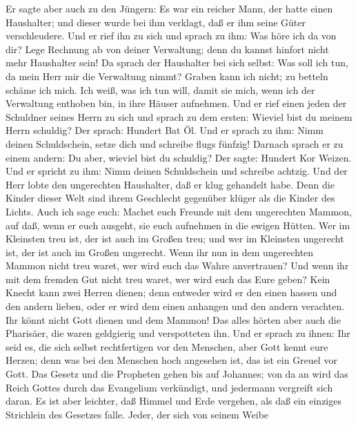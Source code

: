  Er sagte aber auch zu den Jüngern: Es war ein reicher
Mann, der hatte einen Haushalter; und dieser wurde bei ihm verklagt, daß
er ihm seine Güter verschleudere.  Und er rief ihn zu sich
und sprach zu ihm: Was höre ich da von dir? Lege Rechnung ab von deiner
Verwaltung; denn du kannst hinfort nicht mehr Haushalter sein!
 Da sprach der Haushalter bei sich selbst: Was soll ich
tun, da mein Herr mir die Verwaltung nimmt? Graben kann ich nicht; zu
betteln schäme ich mich.  Ich weiß, was ich tun will,
damit sie mich, wenn ich der Verwaltung enthoben bin, in ihre Häuser
aufnehmen.  Und er rief einen jeden der Schuldner seines
Herrn zu sich und sprach zu dem ersten: Wieviel bist du meinem Herrn
schuldig?  Der sprach: Hundert Bat Öl. Und er sprach zu
ihm: Nimm deinen Schuldschein, setze dich und schreibe flugs fünfzig!
 Darnach sprach er zu einem andern: Du aber, wieviel bist
du schuldig? Der sagte: Hundert Kor Weizen. Und er spricht zu ihm: Nimm
deinen Schuldschein und schreibe achtzig.  Und der Herr
lobte den ungerechten Haushalter, daß er klug gehandelt habe. Denn die
Kinder dieser Welt sind ihrem Geschlecht gegenüber klüger als die Kinder
des Lichts.  Auch ich sage euch: Machet euch Freunde mit
dem ungerechten Mammon, auf daß, wenn er euch ausgeht, sie euch
aufnehmen in die ewigen Hütten.  Wer im Kleinsten treu
ist, der ist auch im Großen treu; und wer im Kleinsten ungerecht ist,
der ist auch im Großen ungerecht.  Wenn ihr nun in dem
ungerechten Mammon nicht treu waret, wer wird euch das Wahre
anvertrauen?  Und wenn ihr mit dem fremden Gut nicht treu
waret, wer wird euch das Eure geben?  Kein Knecht kann
zwei Herren dienen; denn entweder wird er den einen hassen und den
andern lieben, oder er wird dem einen anhangen und den andern verachten.
Ihr könnt nicht Gott dienen und dem Mammon!  Das alles
hörten aber auch die Pharisäer, die waren geldgierig und verspotteten
ihn.  Und er sprach zu ihnen: Ihr seid es, die sich
selbst rechtfertigen vor den Menschen, aber Gott kennt eure Herzen; denn
was bei den Menschen hoch angesehen ist, das ist ein Greuel vor Gott.
 Das Gesetz und die Propheten gehen bis auf Johannes; von
da an wird das Reich Gottes durch das Evangelium verkündigt, und
jedermann vergreift sich daran.  Es ist aber leichter,
daß Himmel und Erde vergehen, als daß ein einziges Strichlein des
Gesetzes falle.  Jeder, der sich von seinem Weibe
